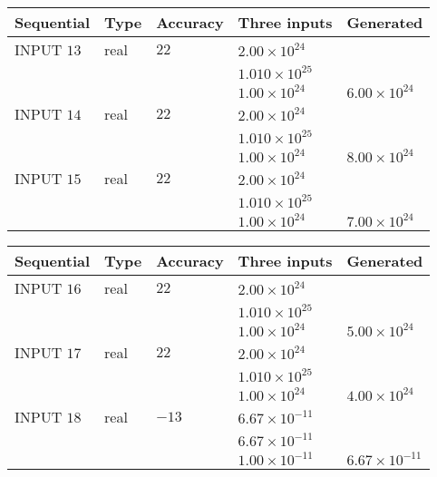 \documentclass[12pt]{article}
\begin{document}
   
  
  
\noindent\begin{tabular}{|l|l|l|l|l|}
\hline
 Sequential & Type & Accuracy & Three inputs & Generated \\ 
\hline
 
 
  INPUT $           13 $ & real & $           22  $ & $
 2.00 \times 10^{24}
  $ & \\
  & & &  $
 1.010 \times 10^{25}
  $ & \\
  & & &  $
 1.00 \times 10^{24}
 $ & $ 6.00 \times 10^{24} $ 
 \\  \hline  
 
 
  INPUT $           14 $ & real & $           22  $ & $
 2.00 \times 10^{24}
  $ & \\
  & & &  $
 1.010 \times 10^{25}
  $ & \\
  & & &  $
 1.00 \times 10^{24}
 $ & $ 8.00 \times 10^{24} $ 
 \\  \hline  
 
 
  INPUT $           15 $ & real & $           22  $ & $
 2.00 \times 10^{24}
  $ & \\
  & & &  $
 1.010 \times 10^{25}
  $ & \\
  & & &  $
 1.00 \times 10^{24}
 $ & $ 7.00 \times 10^{24} $ 
 \\  \hline  
 \end{tabular}
   
   
  
  
\noindent\begin{tabular}{|l|l|l|l|l|}
\hline
 Sequential & Type & Accuracy & Three inputs & Generated \\ 
\hline
 
 
  INPUT $           16 $ & real & $           22  $ & $
 2.00 \times 10^{24}
  $ & \\
  & & &  $
 1.010 \times 10^{25}
  $ & \\
  & & &  $
 1.00 \times 10^{24}
 $ & $ 5.00 \times 10^{24} $ 
 \\  \hline  
 
 
  INPUT $           17 $ & real & $           22  $ & $
 2.00 \times 10^{24}
  $ & \\
  & & &  $
 1.010 \times 10^{25}
  $ & \\
  & & &  $
 1.00 \times 10^{24}
 $ & $ 4.00 \times 10^{24} $ 
 \\  \hline  
 
 
  INPUT $           18 $ & real & $          -13  $ & $
 6.67 \times 10^{-11}
  $ & \\
  & & &  $
 6.67 \times 10^{-11}
  $ & \\
  & & &  $
 1.00 \times 10^{-11}
 $ & $ 6.67 \times 10^{-11} $ 
 \\  \hline  
 \end{tabular}
   
\end{document}
